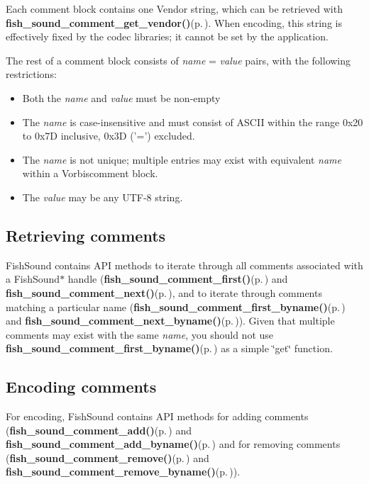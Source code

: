Each comment block contains one Vendor string, which can be retrieved with {\bf fish\_\-sound\_\-comment\_\-get\_\-vendor()}{\rm (p.\,\pageref{comments_8h_a0})}. When encoding, this string is effectively fixed by the codec libraries; it cannot be set by the application.

The rest of a comment block consists of {\em name\/} = {\em value\/} pairs, with the following restrictions:\begin{itemize}
\item Both the {\em name\/} and {\em value\/} must be non-empty\item The {\em name\/} is case-insensitive and must consist of ASCII within the range 0x20 to 0x7D inclusive, 0x3D ('=') excluded.\item The {\em name\/} is not unique; multiple entries may exist with equivalent {\em name\/} within a Vorbiscomment block.\item The {\em value\/} may be any UTF-8 string.\end{itemize}
\subsection{Retrieving comments}\label{comments_get}
Fish\-Sound contains API methods to iterate through all comments associated with a Fish\-Sound$\ast$ handle ({\bf fish\_\-sound\_\-comment\_\-first()}{\rm (p.\,\pageref{comments_8h_a1})} and {\bf fish\_\-sound\_\-comment\_\-next()}{\rm (p.\,\pageref{comments_8h_a2})}, and to iterate through comments matching a particular name ({\bf fish\_\-sound\_\-comment\_\-first\_\-byname()}{\rm (p.\,\pageref{comments_8h_a3})} and {\bf fish\_\-sound\_\-comment\_\-next\_\-byname()}{\rm (p.\,\pageref{comments_8h_a4})}). Given that multiple comments may exist with the same {\em name\/}, you should not use {\bf fish\_\-sound\_\-comment\_\-first\_\-byname()}{\rm (p.\,\pageref{comments_8h_a3})} as a simple \char`\"{}get\char`\"{} function.\subsection{Encoding comments}\label{comments_set}
For encoding, Fish\-Sound contains API methods for adding comments ({\bf fish\_\-sound\_\-comment\_\-add()}{\rm (p.\,\pageref{comments_8h_a5})} and {\bf fish\_\-sound\_\-comment\_\-add\_\-byname()}{\rm (p.\,\pageref{comments_8h_a6})} and for removing comments ({\bf fish\_\-sound\_\-comment\_\-remove()}{\rm (p.\,\pageref{comments_8h_a7})} and {\bf fish\_\-sound\_\-comment\_\-remove\_\-byname()}{\rm (p.\,\pageref{comments_8h_a8})}).

